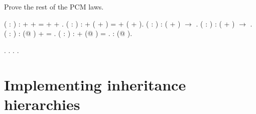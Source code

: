 \begin{exercise} 
Prove the rest of the PCM laws.


\begin{coqdoccode}
\coqdocemptyline
\coqdocnoindent
{}  (   : ) :  +  +  =  +  + .\coqdoceol
\coqdocemptyline
\coqdocnoindent
{}  (   : ) :  + ( + ) =  + ( + ).\coqdoceol
\coqdocemptyline
\coqdocnoindent
{}  (  : ) :  ( + ) \ensuremath{\rightarrow}  .\coqdoceol
\coqdocemptyline
\coqdocnoindent
{}  (  : ) :  ( + ) \ensuremath{\rightarrow}  .\coqdoceol
\coqdocemptyline
\coqdocnoindent
{}  ( : ) : (@ ) +  = .\coqdoceol
\coqdocemptyline
\coqdocnoindent
{}  ( : ) :  + (@ ) = .\coqdoceol
\coqdocemptyline
\coqdocnoindent
{}  :  (@ ).\coqdoceol
\coqdocemptyline
\end{coqdoccode}


\end{exercise}


\begin{coqdoccode}
\coqdocemptyline
\coqdocnoindent
{} .\coqdoceol
\coqdocemptyline
\coqdocnoindent
{} .\coqdoceol
\coqdocemptyline
\coqdocnoindent
{} .\coqdoceol
\coqdocemptyline
\coqdocnoindent
{} .\coqdoceol
\coqdocemptyline
\end{coqdoccode}


\section{Implementing inheritance hierarchies}




